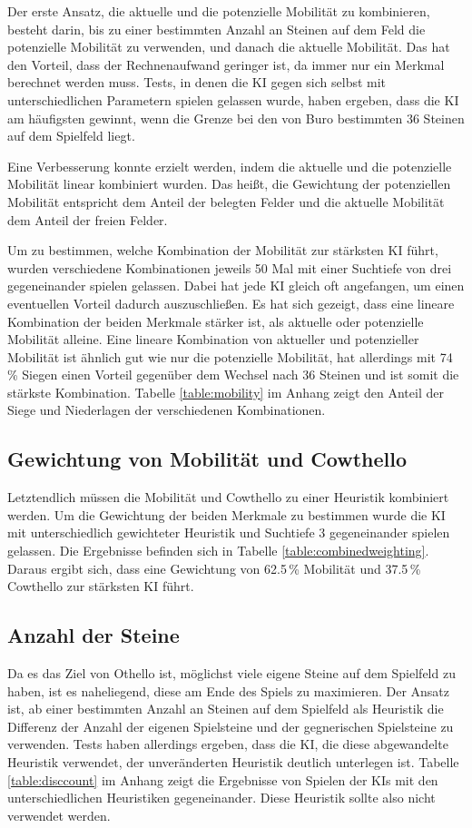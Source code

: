 Der erste Ansatz, die aktuelle und die potenzielle Mobilität zu kombinieren, besteht darin, bis zu einer bestimmten
Anzahl an Steinen auf dem Feld die potenzielle Mobilität zu verwenden, und danach die aktuelle Mobilität. Das hat den
Vorteil, dass der Rechnenaufwand geringer ist, da immer nur ein Merkmal berechnet werden muss. Tests, in denen die \ac{KI}
gegen sich selbst mit unterschiedlichen Parametern spielen gelassen wurde, haben ergeben, dass die \ac{KI} am häufigsten
gewinnt, wenn die Grenze bei den von Buro bestimmten 36 Steinen auf dem Spielfeld liegt.

Eine Verbesserung konnte erzielt werden, indem die aktuelle und die potenzielle Mobilität linear kombiniert wurden.
Das heißt, die Gewichtung der potenziellen Mobilität entspricht dem Anteil der belegten Felder und die aktuelle Mobilität
dem Anteil der freien Felder.

Um zu bestimmen, welche Kombination der Mobilität zur stärksten \ac{KI} führt, wurden verschiedene Kombinationen jeweils 50
Mal mit einer Suchtiefe von drei gegeneinander spielen gelassen. Dabei hat jede \ac{KI} gleich oft angefangen, um einen
eventuellen Vorteil dadurch auszuschließen. Es hat sich gezeigt, dass eine lineare Kombination der beiden Merkmale
stärker ist, als aktuelle oder potenzielle Mobilität alleine. Eine lineare Kombination von aktueller und potenzieller
Mobilität ist ähnlich gut wie nur die potenzielle Mobilität, hat allerdings mit 74\,\% Siegen einen Vorteil gegenüber
dem Wechsel nach 36 Steinen und ist somit die stärkste Kombination. Tabelle \ref{table:mobility} im Anhang zeigt den
Anteil der Siege und Niederlagen der verschiedenen Kombinationen.

\subsection{Gewichtung von Mobilität und Cowthello} \label{sec:mobcowweight}
Letztendlich müssen die Mobilität und Cowthello zu einer Heuristik kombiniert werden. Um die Gewichtung der beiden
Merkmale zu bestimmen wurde die \ac{KI} mit unterschiedlich gewichteter Heuristik und Suchtiefe 3 gegeneinander spielen
gelassen. Die Ergebnisse befinden sich in Tabelle \ref{table:combinedweighting}. Daraus ergibt sich, dass eine
Gewichtung von 62.5\,\% Mobilität und 37.5\,\% Cowthello zur stärksten \ac{KI} führt.

\subsection{Anzahl der Steine}
Da es das Ziel von Othello ist, möglichst viele eigene Steine auf dem Spielfeld zu haben, ist es naheliegend, diese am
Ende des Spiels zu maximieren. Der Ansatz ist, ab einer bestimmten Anzahl an Steinen auf dem Spielfeld als Heuristik die
Differenz der Anzahl der eigenen Spielsteine und der gegnerischen Spielsteine zu verwenden. Tests haben allerdings
ergeben, dass die \ac{KI}, die diese abgewandelte Heuristik verwendet, der unveränderten Heuristik deutlich unterlegen ist.
Tabelle \ref{table:disccount} im Anhang zeigt die Ergebnisse von Spielen der \acp{KI} mit den unterschiedlichen Heuristiken
gegeneinander. Diese Heuristik sollte also nicht verwendet werden.
